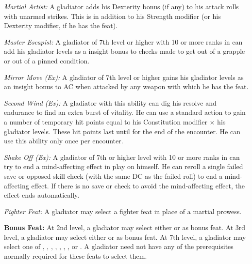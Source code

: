 \textit{Martial Artist:} A gladiator adds his Dexterity bonus (if any) to his attack rolls with unarmed strikes. This is in addition to his Strength modifier (or his Dexterity modifier, if he has the  feat).

\textit{Master Escapist:} A gladiator of 7th level or higher with 10 or more ranks in  can add \onehalf his gladiator levels as a insight bonus to  checks made to get out of a grapple or out of a pinned condition.

\textit{Mirror Move (Ex):} A gladiator of 7th level or higher gains \onequarter his gladiator levels as an insight bonus to AC when attacked by any weapon with which he has the  feat.

\textit{Second Wind (Ex):} A gladiator with this ability can dig his resolve and endurance to find an extra burst of vitality. He can use a standard action to gain a number of temporary hit points equal to his Constitution modifier $\times$ his gladiator levels. These hit points last until for the end of the encounter. He can use this ability only once per encounter.

\textit{Shake Off (Ex):} A gladiator of 7th or higher level with 10 or more ranks in  can try to end a mind-affecting effect in play on himself. He can reroll a single failed save or opposed skill check (with the same DC as the failed roll) to end a mind-affecting effect. If there is no save or check to avoid the mind-affecting effect, the effect ends automatically.

\textit{Fighter Feat:} A gladiator may select a fighter feat in place of a martial prowess.


\textbf{Bonus Feat:} At 2nd level, a gladiator may select either  or  as bonus feat. At 3rd level, a gladiator may select either  or  as bonus feat. At 7th level, a gladiator may select one of , , , , , , , or . A gladiator need not have any of the prerequisites normally required for these feats to select them.

